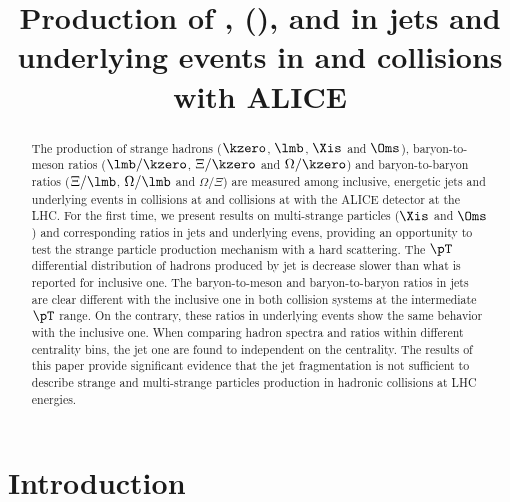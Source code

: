 \documentclass[ALICE,manyauthors]{cernphprep}
\begin{document}
\begin{titlepage}

\title{Production of \kzero, \lmb (\almb), \Xis and \Oms in jets and underlying events in \pp and \pPb collisions with ALICE}


\begin{abstract}
\label{sec:Abs}

The production of strange hadrons ($\kzero$, $\lmb$, $\Xis$ and $\Oms$), baryon-to-meson ratios ($\lmb/\kzero$, $\Xi/\kzero$ and $\Omega/\kzero$) and baryon-to-baryon ratios ($\Xi/\lmb$, $\Omega/\lmb$ and $\Omega/\Xi$) are measured among inclusive, energetic jets and underlying events in \pp collisions at \thirteen and \pPb collisions at \fivenn with the ALICE detector at the LHC.
For the first time, we present results on multi-strange particles ($\Xis$ and $\Oms$) and corresponding ratios in jets and underlying evens, providing an opportunity to test the strange particle production mechanism with a hard scattering.
The $\pT$ differential distribution of hadrons produced by jet is decrease slower than what is reported for inclusive one.
The baryon-to-meson and baryon-to-baryon ratios in jets are clear different with the inclusive one in both collision systems at the intermediate $\pT$ range.
On the contrary, these ratios in underlying events show the same behavior with the inclusive one.
When comparing hadron spectra and ratios within different centrality bins, the jet one are found to independent on the centrality.
The results of this paper provide significant evidence that the jet fragmentation is not sufficient to describe strange and multi-strange particles production in hadronic collisions at LHC energies. 


\end{abstract}

\end{titlepage}

\setcounter{page}{2}


\section{Introduction}%
\label{sec:Introduction}
\end{document}
